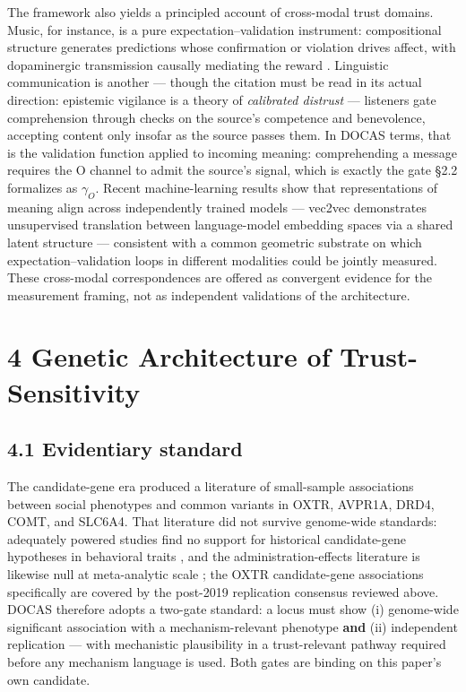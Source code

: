 \documentclass[
]{article}
\begin{document}
The framework also yields a principled account of cross-modal trust
domains. Music, for instance, is a pure expectation--validation
instrument: compositional structure generates predictions whose
confirmation or violation drives affect, with dopaminergic transmission
causally mediating the reward . Linguistic communication is another ---
though the citation must be read in its actual direction: epistemic
vigilance is a theory of \emph{calibrated distrust} --- listeners gate
comprehension through checks on the source's competence and benevolence,
accepting content only insofar as the source passes them. In DOCAS
terms, that is the validation function applied to incoming meaning:
comprehending a message requires the O channel to admit the source's
signal, which is exactly the gate §2.2 formalizes as \(\gamma_O\).
Recent machine-learning results show that representations of meaning
align across independently trained models --- vec2vec demonstrates
unsupervised translation between language-model embedding spaces via a
shared latent structure --- consistent with a common geometric substrate
on which expectation--validation loops in different modalities could be
jointly measured. These cross-modal correspondences are offered as
convergent evidence for the measurement framing, not as independent
validations of the architecture.

\section{4 Genetic Architecture of
Trust-Sensitivity}\label{genetic-architecture-of-trust-sensitivity}

\subsection{4.1 Evidentiary standard}\label{evidentiary-standard}

The candidate-gene era produced a literature of small-sample
associations between social phenotypes and common variants in OXTR,
AVPR1A, DRD4, COMT, and SLC6A4. That literature did not survive
genome-wide standards: adequately powered studies find no support for
historical candidate-gene hypotheses in behavioral traits , and the
administration-effects literature is likewise null at meta-analytic
scale ; the OXTR candidate-gene associations specifically are covered by
the post-2019 replication consensus reviewed above. DOCAS therefore
adopts a two-gate standard: a locus must show (i) genome-wide
significant association with a mechanism-relevant phenotype \textbf{and}
(ii) independent replication --- with mechanistic plausibility in a
trust-relevant pathway required before any mechanism language is used.
Both gates are binding on this paper's own candidate.
\end{document}
